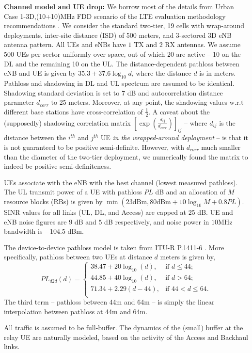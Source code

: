 \documentclass[journal]{IEEEtran}
\begin{document}
\appendix
\label{sec:sysModel}
{\bf Channel model and UE drop:}
We borrow most of the details from Urban Case 1-3D,(10+10)MHz FDD scenario of the LTE evaluation methodology recommendations \cite[Annex A]{3GPP36814}.  We consider the standard two-tier, 19 cells with wrap-around deployments, inter-site distance (ISD) of 500 meters, and 3-sectored 3D eNB antenna pattern.  All UEs and eNBs have $1$ TX and $2$ RX antennas.  We assume 500 UEs per sector uniformly over space, out of which 20 are active -- 10 on the DL and the remaining 10 on the UL.  The distance-dependent pathloss between eNB and UE is given by $35.3+37.6\log_{10} d$, where the distance $d$ is in meters. Pathloss and shadowing in DL and UL spectrum are assumed to be identical. Shadowing standard deviation is set to $7$ dB and autocorrelation distance parameter $d_{corr}$ to $25$ meters.  Moreover, at any point, the shadowing values w.r.t different base stations have cross-correlation of $\frac{1}{2}$. A caveat about the (supposedly) shadowing correlation matrix $[\exp(\frac{d_{ij}}{d_{corr}})]_{ij}$ -- where $d_{ij}$ is the distance between the $i^{th}$ and $j^{th}$ UE {\em in the wrapped-around deployment} -- is that it is not guaranteed to be positive semi-definite.  However, with $d_{corr}$ much smaller than the diameter of the two-tier deployment, we numerically found the matrix to indeed be positive semi-definiteness.

UEs associate with the eNB with the best channel (lowest measured pathloss).  The UL transmit power of a UE with pathloss $PL$ dB and an allocation of $M$ resource blocks (RBs) is given by $\min\left(23\mbox{dBm},80\mbox{dBm} + 10\log_{10}M + 0.8PL\right)$.  SINR values for all links (UL, DL, and Access) are capped at $25$ dB. UE and eNB noise figures are $9$ dB and $5$ dB respectively, and noise power in $10$MHz bandwidth is $-104.5$ dBm.

The device-to-device pathloss model is taken from ITU-R P.1411-6 \cite{ITU1411}. More specifically, pathloss between two UEs at distance $d$ meters is given by,
$$
    PL_{d2d}(d) = \left\{
                            \begin{array}{ll}
                                38.47+20\log_{10}(d), & \mbox{if } d \leq 44; \\
                                44.85+40\log_{10}(d), & \mbox{if } d > 64; \\
                                71.34+2.29(d-44),     & \mbox{if } 44<d\leq 64. \\
                            \end{array}
                    \right.
$$
The third term -- pathloss between 44m and 64m -- is simply the linear interpolation between pathloss at 44m and 64m.

All traffic is assumed to be full-buffer.  The dynamics of the (small) buffer at the relay UE are naturally modeled, based on the activity of the Access and Backhaul links.
\end{document}
